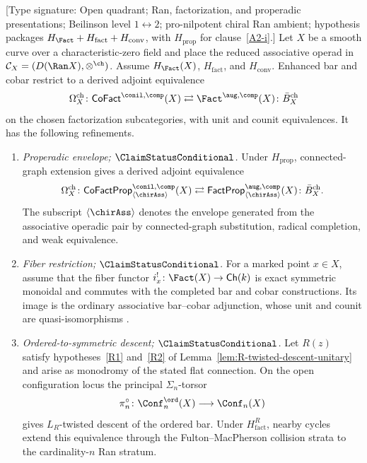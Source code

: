 \begin{theorem}
\label{thm:A-infinity-2}
\label{thm:theorem-A-E1}
\textup{[Type signature: Open quadrant; Ran, factorization, and
properadic presentations; Beilinson level $1\leftrightarrow2$;
pro-nilpotent chiral Ran ambient; hypothesis packages
$H_{\Fact}+H_{\mathrm{fact}}+H_{\mathrm{conv}}$, with
$H_{\mathrm{prop}}$ for clause~\ref{A2-i}.]}
Let $X$ be a smooth curve over a characteristic-zero field and place
the reduced associative operad in
$\mathcal C_X=(D(\Ran X),\otimes^{\ch})$.  Assume
$H_{\Fact}(X)$, $H_{\mathrm{fact}}$, and $H_{\mathrm{conv}}$.
Enhanced bar and cobar restrict to a derived
adjoint equivalence
\[
 \Omegach_X\colon\CoFact^{\conil,\comp}(X)
 \rightleftarrows
 \Fact^{\aug,\comp}(X)\colon\Bbarch_X
\]
on the chosen factorization subcategories, with unit and counit
equivalences.  It has the following refinements.
\begin{enumerate}[label=\textup{(\roman*)}]
\item \label{A2-i} \emph{Properadic envelope;
$\ClaimStatusConditional$.}
Under $H_{\mathrm{prop}}$, connected-graph extension gives a derived
adjoint equivalence
\[
 \Omegach_X\colon
 \CoFactProp^{\conil,\comp}_{\langle\chirAss\rangle}(X)
 \rightleftarrows
 \FactProp^{\aug,\comp}_{\langle\chirAss\rangle}(X)
 \colon\Bbarch_X .
\]
The subscript $\langle\chirAss\rangle$ denotes the envelope generated
from the associative operadic pair by connected-graph substitution,
radical completion, and weak equivalence.

\item \label{A2-ii} \emph{Fiber restriction;
$\ClaimStatusConditional$.}
For a marked point $x\in X$, assume that the fiber functor
$i_x^!\colon\Fact(X)\to\mathsf{Ch}(k)$ is exact symmetric monoidal and
commutes with the completed bar and cobar constructions.  Its image is
the ordinary associative bar--cobar adjunction, whose unit and counit
are quasi-isomorphisms \cite[Corollary~2.3.4]{LV12}.

\item \label{A2-iii} \emph{Ordered-to-symmetric descent;
$\ClaimStatusConditional$.}
Let $R(z)$ satisfy hypotheses~\ref{R1} and~\ref{R2} of
Lemma~\ref{lem:R-twisted-descent-unitary} and arise as monodromy of the
stated flat connection.  On the open configuration locus the principal
$\Sigma_n$-torsor
\[
 \pi_n^\circ\colon\Conf_n^{\ord}(X)\longrightarrow\Conf_n(X)
\]
gives $L_R$-twisted descent of the ordered bar.  Under
$H_{\mathrm{fact}}^{R}$, nearby cycles extend this equivalence through
the Fulton--MacPherson collision strata to the cardinality-$n$ Ran
stratum.
\end{enumerate}
\end{theorem}

